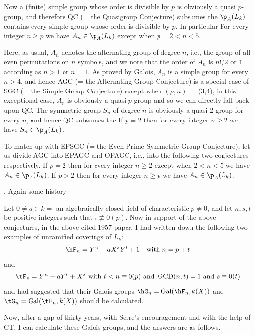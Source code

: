 Now a (finite) simple group whose order is divisible by 
$p$ is obviously a
quasi $p$-group, and therefore QC (= the Quasigroup 
Conjecture) subsumes the
 $\p_A(L_k)$ contains every 
simple group 
whose order is divisible by $p$.
\enddfn
In particular
 For every 
integer $n\geq p$ we have
$A_n\in \p_A(L_k)$ except when $p=2<n<5$.

Here, as usual, $A_n$ denotes the alternating group of 
degree $n$, i.e.,
the group of all even permutations on $n$ symbols, and we 
note that the
order of $A_n$ is $n!/2$ or $1$ according as $n>1$ or 
$n=1$. 
As proved by Galois, $A_n$ is a simple group for every 
$n>4$,
and hence AGC (= the Alternating Group Conjecture) is a 
special case of SGC 
(= the Simple Group Conjecture) except when $(p,n)=$ 
(3,4); in this exceptional
case, $A_n$ is obviously a quasi $p$-group and so we can 
directly fall back 
upon QC. The symmetric
group $S_n$ of degree $n$ is obviously a quasi $2$-group 
for every $n$, and
hence QC subsumes the
If $p=2$ then for every 
integer $n\geq 2$ we have $S_n\in\p_A(L_k)$.
\enddfn

To match up with EPSGC (= the Even Prime Symmetric Group 
Conjecture), let
us divide AGC into EPAGC and OPAGC, i.e., into the 
following two
conjectures respectively.
 If 
$p=2$ then for every 
integer $n\geq 2$ except when $2<n<5$ we have 
$A_n\in\p_A(L_k)$.
{} If 
$p>2$ then for every 
integer $n\geq p$ we have $A_n\in\p_A(L_k)$.

. Again some history\endheading

Let $0\neq a\in k=$ an algebraically closed field of 
characteristic 
$p\neq 0$, and let $n,s,t$ be positive integers such that 
$t\not\equiv 0(p)$.
Now in support of the above conjectures, in the above 
cited 1957 paper, I 
had written down the following two examples of unramified 
coverings
of $L_k$:
$$
\hF_n=Y^n-aX^sY^t+1\quad\text{with }n=p+t
$$ 
and
$$
\tF_n=Y^n-aY^t+X^s\text{ with }t<n\equiv 0(p)\text{ and 
}\operatorname{GCD}(n,t)=1\text{ and }
s\equiv 0(t)
$$
and  had suggested that their Galois groups 
$\hG_n=\operatorname{Gal}(\hF_n,k(X))$
and $\tG_n=\operatorname{Gal}(\tF_n,k(X))$ should be 
calculated.

Now, after a gap of thirty years, with Serre's 
encouragement and with the help
of CT, I can calculate these Galois groups, and the 
answers are as follows.

